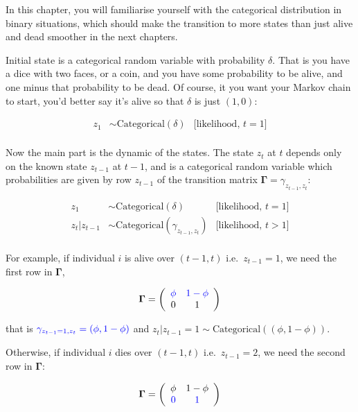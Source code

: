 \documentclass[
  12pt,
]{krantz}
\begin{document}
In this chapter, you will familiarise yourself with the categorical distribution in binary situations, which should make the transition to more states than just alive and dead smoother in the next chapters.

Initial state is a categorical random variable with probability \(\delta\). That is you have a dice with two faces, or a coin, and you have some probability to be alive, and one minus that probability to be dead. Of course, it you want your Markov chain to start, you'd better say it's alive so that \(\delta\) is just \((1,0)\):

\begin{align*}
   z_1 &\sim \text{Categorical}(\delta) &\text{[likelihood, }t = 1 \text{]}\\
\end{align*}

Now the main part is the dynamic of the states. The state \(z_t\) at \(t\) depends only on the known state \(z_{t-1}\) at \(t-1\), and is a categorical random variable which probabilities are given by row \(z_{t-1}\) of the transition matrix \(\mathbf{\Gamma} = \gamma_{z_{t-1},z_{t}}\):

\begin{align*}
   z_1 &\sim \text{Categorical}(\delta) &\text{[likelihood, }t = 1 \text{]}\\
   z_t | z_{t-1} &\sim \text{Categorical}(\gamma_{z_{t-1},z_{t}}) &\text{[likelihood, }t > 1 \text{]}\\
\end{align*}

For example, if individual \(i\) is alive over \((t-1,t)\) i.e.~\(z_{t-1} = 1\), we need the first row in \(\mathbf{\Gamma}\),

\begin{align*}
\mathbf{\Gamma} =
\left(\begin{array}{cc}
\color{blue}{\phi} & \color{blue}{1 - \phi}\\
0 & 1
\end{array}\right)
\end{align*}

that is \(\color{blue}{\gamma_{z_{t-1} = 1,z_{t}} = (\phi, 1-\phi)}\) and \(z_t | z_{t-1} = 1 \sim \text{Categorical}((\phi, 1-\phi))\).

Otherwise, if individual \(i\) dies over \((t-1,t)\) i.e.~\(z_{t-1} = 2\), we need the second row in \(\mathbf{\Gamma}\):

\begin{align*}
\mathbf{\Gamma} =
\left(\begin{array}{cc}
\phi & 1 - \phi\\
\color{blue}{0} & \color{blue}{1}
\end{array}\right)
\end{align*}
\end{document}
